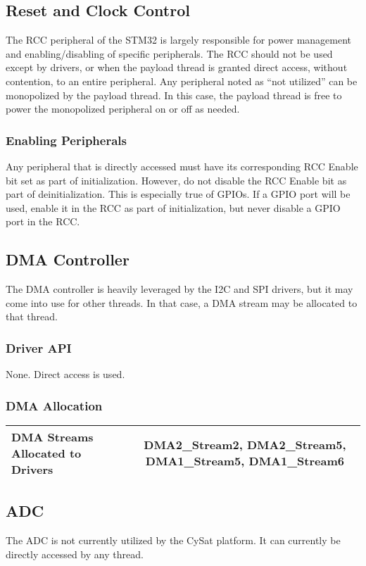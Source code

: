 \documentclass[10pt]{extarticle}
\begin{document}
\subsection{Reset and Clock Control}
The RCC peripheral of the STM32 is largely responsible for power management
and enabling/disabling of specific peripherals. The RCC 
should not be used except
by drivers, or when the payload thread 
is granted direct access, without contention,
to an entire peripheral. Any peripheral noted as ``not utilized'' can
be monopolized by the payload thread. 
In this case, the payload thread is free to
power the monopolized peripheral on or off as needed.
\subsubsection{Enabling Peripherals}
Any peripheral that is directly accessed must have its corresponding 
RCC Enable bit set as part of initialization. However, do not disable
the RCC Enable bit as part of deinitialization. This is especially
true of GPIOs. If a GPIO port will be used, enable it in the
RCC as part of initialization, but never disable a GPIO port in
the RCC.

\subsection{DMA Controller}
The DMA controller is heavily leveraged by the I2C and SPI drivers, but it may
come into use for other threads. In that case, a DMA stream may be allocated
to that thread.
\subsubsection{Driver API}
None. Direct access is used.
\subsubsection{DMA Allocation}
\begin{tabular}{| l | c |}
    \hline 
    DMA Streams Allocated to Drivers & DMA2\_Stream2, DMA2\_Stream5, DMA1\_Stream5, DMA1\_Stream6\\ \hline
\end{tabular}

\subsection{ADC}
The ADC is not currently utilized by the CySat platform. It can currently be directly
accessed by any thread.
\end{document}
